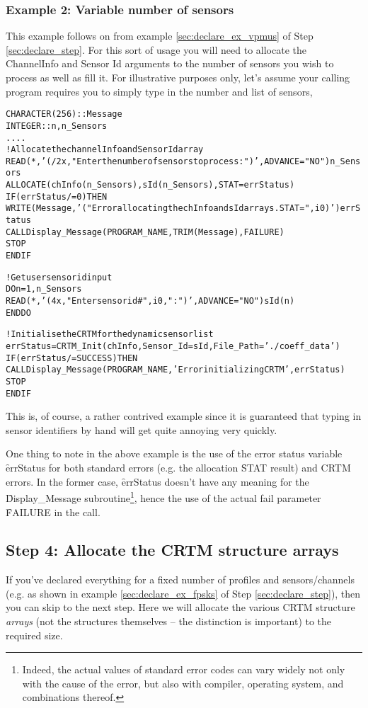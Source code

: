 \subsubsection{Example 2: Variable number of sensors}
\label{sec:init_ex_vns}
This example follows on from example \ref{sec:declare_ex_vpmus} of Step \ref{sec:declare_step}. For this sort of usage you will need to allocate the ChannelInfo and Sensor Id arguments to the number of sensors you wish to process as well as fill it. For illustrative purposes only, let's assume your calling program requires you to simply type in the number and list of sensors,
\begin{alltt}
  CHARACTER(256) :: Message
  INTEGER :: n, n_Sensors
  ....
  ! Allocate the channelInfo and Sensor Id array
  READ( *,'(/2x,"Enter the number of sensors to process: ")', ADVANCE="NO" ) n_Sensors
  ALLOCATE( chInfo(n_Sensors), sId(n_Sensors), STAT=errStatus )
  IF ( errStatus /= 0 ) THEN
    WRITE( Message,'("Error allocating the chInfo and sId arrays. STAT=",i0)' ) errStatus
    CALL Display_Message( PROGRAM_NAME,TRIM(Message),FAILURE )
    STOP
  END IF
  
  ! Get user sensor id input
  DO n = 1, n_Sensors
    READ( *,'(4x,"Enter sensor id #",i0,": ")', ADVANCE="NO" ) sId(n)
  END DO
  
  ! Initialise the CRTM for the dynamic sensor list
  errStatus = CRTM_Init( chInfo, Sensor_Id=sId, File_Path='./coeff_data' )
  IF ( errStatus /= SUCCESS ) THEN 
    CALL Display_Message( PROGRAM_NAME,'Error initializing CRTM',errStatus )
    STOP
  END IF\end{alltt}

This is, of course, a rather contrived example since it is guaranteed that typing in sensor identifiers by hand will get quite annoying very quickly.

One thing to note in the above example is the use of the error status variable \f{errStatus} for both standard errors (e.g. the allocation \f{STAT} result) and CRTM errors. In the former case, \f{errStatus} doesn't have any meaning for the \f{Display\_Message} subroutine\footnote{Indeed, the actual values of standard error codes can vary widely not only with the cause of the error, but also with compiler, operating system, and combinations thereof.}, hence the use of the actual fail parameter \f{FAILURE} in the call.


\subsection{Step 4: Allocate the CRTM structure arrays}
\label{sec:alloc_arr_step}
If you've declared everything for a fixed number of profiles and sensors/channels (e.g. as shown in example \ref{sec:declare_ex_fpsks} of Step \ref{sec:declare_step}), then you can skip to the next step. Here we will allocate the various CRTM structure \textit{arrays} (not the structures themselves -- the distinction is important) to the required size.

